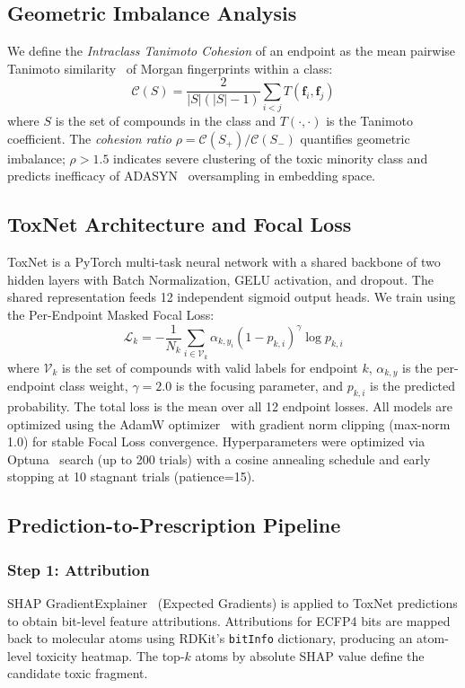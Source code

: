 \documentclass[lettersize,journal]{IEEEtran}
\begin{document}
\subsection{Geometric Imbalance Analysis}
We define the \textit{Intraclass Tanimoto Cohesion} of an endpoint as the mean
pairwise Tanimoto similarity~\cite{rogers2010} of Morgan fingerprints within
a class:
\begin{equation}
  \mathcal{C}(S) = \frac{2}{|S|(|S|-1)} \sum_{i<j} T(\mathbf{f}_i, \mathbf{f}_j)
  \label{eq:cohesion}
\end{equation}
where $S$ is the set of compounds in the class and $T(\cdot,\cdot)$ is the
Tanimoto coefficient.
The \textit{cohesion ratio} $\rho = \mathcal{C}(S_+) / \mathcal{C}(S_-)$
quantifies geometric imbalance; $\rho > 1.5$ indicates severe clustering of the
toxic minority class and predicts inefficacy of ADASYN~\cite{he2008adasyn} oversampling in embedding space.

\subsection{ToxNet Architecture and Focal Loss}
ToxNet is a PyTorch multi-task neural network with a shared backbone of two
hidden layers with Batch Normalization, GELU activation, and dropout.
The shared representation feeds 12 independent sigmoid output heads.
We train using the Per-Endpoint Masked Focal Loss:
\begin{equation}
  \mathcal{L}_k = -\frac{1}{N_k}\sum_{i \in \mathcal{V}_k}
    \alpha_{k,y_i}(1-p_{k,i})^{\gamma} \log p_{k,i}
  \label{eq:focal}
\end{equation}
where $\mathcal{V}_k$ is the set of compounds with valid labels for endpoint $k$,
$\alpha_{k,y}$ is the per-endpoint class weight, $\gamma=2.0$ is the focusing
parameter, and $p_{k,i}$ is the predicted probability.
The total loss is the mean over all 12 endpoint losses.
All models are optimized using the AdamW optimizer~\cite{loshchilov2019adamw} with
gradient norm clipping (max-norm 1.0) for stable Focal Loss convergence.
Hyperparameters were optimized via Optuna~\cite{akiba2019optuna} search (up to 200 trials)
with a cosine annealing schedule and early stopping at 10 stagnant trials (patience=15).

  \subsection{Prediction-to-Prescription Pipeline}

  \subsubsection{Step 1: Attribution}
  SHAP GradientExplainer~\cite{lundberg2017} (Expected Gradients) is applied to ToxNet predictions to obtain bit-level
  feature attributions.
  Attributions for ECFP4 bits are mapped back to molecular atoms using RDKit's
  \texttt{bitInfo} dictionary, producing an atom-level toxicity heatmap.
  The top-$k$ atoms by absolute SHAP value define the candidate toxic fragment.
\end{document}

